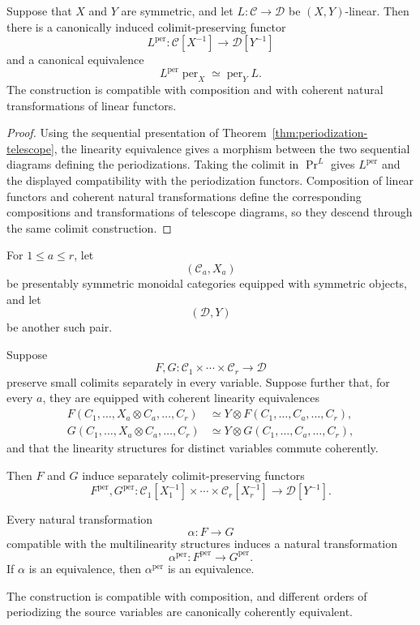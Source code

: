 \begin{proposition}
\label{prop:linear-functor-periodization}
Suppose that $X$ and $Y$ are symmetric, and let $L:\mathcal C\to\mathcal D$ be
$(X,Y)$-linear.  Then there is a canonically induced
colimit-preserving functor
\[
    L^{\mathrm{per}}:
    \mathcal C[X^{-1}]
    \longrightarrow
    \mathcal D[Y^{-1}]
\]
and a canonical equivalence
\[
    L^{\mathrm{per}}\operatorname{per}_X
    \simeq
    \operatorname{per}_Y L.
\]
The construction is compatible with composition and with coherent natural transformations of
linear functors.
\end{proposition}

\begin{proof}
Using the sequential presentation of Theorem~\ref{thm:periodization-telescope}, the linearity
equivalence gives a morphism between the two sequential diagrams defining the periodizations.
Taking the colimit in $\Pr^L$ gives $L^{\mathrm{per}}$ and the displayed compatibility with the
periodization functors.  Composition of linear functors and coherent natural transformations define
the corresponding compositions and transformations of telescope diagrams, so they descend through
the same colimit construction.
\end{proof}

\begin{proposition}
\label{prop:multilinear-periodization}
For \(1\leq a\leq r\), let
\[
    (\mathcal C_a,X_a)
\]
be presentably symmetric monoidal categories equipped with symmetric objects,
and let
\[
    (\mathcal D,Y)
\]
be another such pair.

Suppose
\[
    F,G:
    \mathcal C_1\times\cdots\times\mathcal C_r
    \longrightarrow
    \mathcal D
\]
preserve small colimits separately in every variable.  Suppose further that,
for every \(a\), they are equipped with coherent linearity equivalences
\[
\begin{aligned}
    F(C_1,\ldots,X_a\otimes C_a,\ldots,C_r)
    &\simeq
    Y\otimes
    F(C_1,\ldots,C_a,\ldots,C_r), \\
    G(C_1,\ldots,X_a\otimes C_a,\ldots,C_r)
    &\simeq
    Y\otimes
    G(C_1,\ldots,C_a,\ldots,C_r),
\end{aligned}
\]
and that the linearity structures for distinct variables commute coherently.

Then \(F\) and \(G\) induce separately colimit-preserving functors
\[
    F^{\mathrm{per}},G^{\mathrm{per}}:
    \mathcal C_1[X_1^{-1}]
    \times\cdots\times
    \mathcal C_r[X_r^{-1}]
    \longrightarrow
    \mathcal D[Y^{-1}].
\]

Every natural transformation
\[
    \alpha:F\longrightarrow G
\]
compatible with the multilinearity structures induces a natural
transformation
\[
    \alpha^{\mathrm{per}}:
    F^{\mathrm{per}}
    \longrightarrow
    G^{\mathrm{per}}.
\]
If \(\alpha\) is an equivalence, then
\(\alpha^{\mathrm{per}}\) is an equivalence.

The construction is compatible with composition, and different orders of
periodizing the source variables are canonically coherently equivalent.
\end{proposition}

